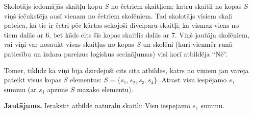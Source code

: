 \documentclass[a4paper,12pt]{article}
\newcommand\answer[1]{}
\begin{document}
\vspace{10pt}
\begin{problem}
Skolotājs iedomājās skaitļu kopu $S$ no četriem skaitļiem; 
katru skaitli no kopas $S$ viņš iečukstēja ausī vienam no četriem skolēniem. 
Tad skolotājs visiem skaļi pateica, ka tie ir četri pēc kārtas 
sekojoši divciparu skaitļi; ka vismaz viens no tiem dalās ar $6$, bet
kāds cits šīs kopas skaitlis dalās ar $7$. 
Viņš jautāja skolēniem, vai viņi var nosaukt visus skaitļus no kopas $S$
un skolēni (kuri vienmēr runā patiesību un izdara pareizus 
loģiskus secinājumus) visi korī atbildēja ``Nē''.

Tomēr, tiklīdz kā viņi bija dzirdējuši cits cita atbildes, 
katrs no viņiem jau varēja pateikt visus 
kopas $S$ elementus: $S = \{ s_1,s_2,s_3,s_4 \}$.
Atrast visu iespējamo $s_1$ summu (ar $s_1$ apzīmē $S$ mazāko elementu).

{\bf Jautājums.} Ierakstīt atbildē naturālu skaitli: Visu iespējamo $s_1$ summu.
\answer{

{\bf Atbilde.} $\mathtt{246}$

Skaitļiem, kuri dalās ar $6$ un $7$ jāatrodas skaitļu ``četrinieka'' vidū (ja kāds atrodas malā, tad
tas, kurš atrodas otrā malā, var uzreiz uzminēt).

Atrodam visus četrus $7$ daudzkārtņus, kas ir blakus $6$ daudzkārtnim: $\{ 35,  49, 77, 91 \}$ ($6$ daudzkārtņi ir attiecīgi $36, 48, 78, 90$).\\
Mazākie skaitļi šajās kopās ir šādi: $34, 47, 76, 89$. To summa ir $246$.
}
\end{problem}


\end{document}

